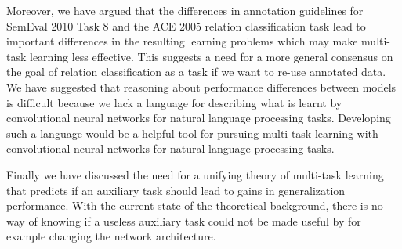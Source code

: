 Moreover, we have argued that the differences in annotation guidelines for SemEval 2010 Task 8 and the ACE 2005 relation classification task lead to important differences in the resulting learning problems which may make multi-task learning less effective. This suggests a need for a more general consensus on the goal of relation classification as a task if we want to re-use annotated data. We have suggested that reasoning about performance differences between models is difficult because we lack a language for describing what is learnt by convolutional neural networks for natural language processing tasks. Developing such a language would be a helpful tool for pursuing multi-task learning with convolutional neural networks for natural language processing tasks.

Finally we have discussed the need for a unifying theory of multi-task learning that predicts if an auxiliary task should lead to gains in generalization performance. With the current state of the theoretical background, there is no way of knowing if a useless auxiliary task could not be made useful by for example changing the network architecture.

